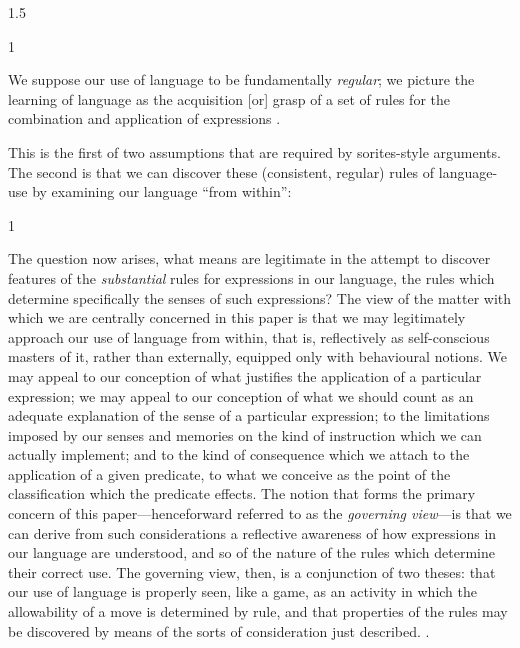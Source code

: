 \documentclass[11pt]{standalone}
\newenvironment{squote}{%
\begin{spacing}{1}
       	\begin{list}{}{%
\setlength{\labelwidth}{0pt}%
\rightmargin\leftmargin%
}
\item\relax
}{%
\end{list}%
\end{spacing}
}
\begin{document}
\begin{spacing}{1.5}
\begin{squote}
We suppose our use of language to be fundamentally {\em regular}; we
picture the learning of language as the acquisition [or] grasp of a
set of rules for the combination and application of expressions
\citep[326]{wright1975}.
\end{squote}

This is the first of two assumptions that are required by
sorites-style arguments.  The second is that we can discover these
(consistent, regular) rules of language-use by examining our language
``from within'':

\begin{squote}
The question now arises, what means are legitimate in the attempt to
discover features of the \emph{substantial} rules for expressions in
our language, the rules which determine specifically the senses of
such expressions?  The view of the matter with which we are centrally
concerned in this paper is that we may legitimately approach our use
of language from within, that is, reflectively as self-conscious
masters of it, rather than externally, equipped only with behavioural
notions.  We may appeal to our conception of what justifies the
application of a particular expression; we may appeal to our
conception of what we should count as an adequate explanation of the
sense of a particular expression; to the limitations imposed by our
senses and memories on the kind of instruction which we can actually
implement; and to the kind of consequence which we attach to the
application of a given predicate, to what we conceive as the point of
the classification which the predicate effects.  The notion that forms
the primary concern of this paper---henceforward referred to as the
\emph{governing view}---is that we can derive from such considerations
a reflective awareness of how expressions in our language are
understood, and so of the nature of the rules which determine their
correct use.  The governing view, then, is a conjunction of two
theses: that our use of language is properly seen, like a game, as an
activity in which the allowability of a move is determined by rule,
and that properties of the rules may be discovered by means of the
sorts of consideration just described. \citep[327]{wright1975}.
\end{squote}


\end{spacing}
\end{document}
